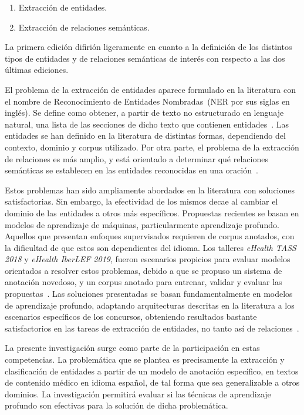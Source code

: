 \begin{enumerate}
	\item Extracción de entidades.
	\item Extracción de relaciones semánticas.
\end{enumerate}

La primera  edici\'on difiri\'on ligeramente en cuanto a la definición de los distintos tipos de entidades y de relaciones semánticas de interés con respecto a las dos \'ultimas ediciones.

El problema de la extracción de entidades aparece formulado en la literatura con el nombre de Reconocimiento de Entidades Nombradas~(NER por sus siglas en inglés).
Se define como obtener, a partir de texto no estructurado en lenguaje natural, una lista de las secciones de dicho texto que contienen entidades~\cite{ehealthkd19_overview, nadeau2007survey}.
Las entidades se han definido en la literatura de distintas formas, dependiendo del contexto, dominio y corpus utilizado.
Por otra parte, el problema de la extracción de relaciones es más amplio, y está orientado a determinar qué relaciones semánticas se establecen en las entidades reconocidas en una oración~\cite{ehealthkd19_overview, kumar2017survey}.

Estos problemas han sido ampliamente abordados en la literatura con soluciones satisfactorias.
Sin embargo, la efectividad de los mismos decae al cambiar el dominio de las entidades a otros más específicos.
Propuestas recientes se basan en modelos de aprendizaje de máquinas, particularmente aprendizaje profundo.
Aquellos que presentan enfoques supervisados requieren de corpus anotados, con la dificultad de que estos son dependientes del idioma.
Los talleres \textit{eHealth TASS 2018} y \textit{eHealth IberLEF 2019}, fueron escenarios propicios para evaluar modelos orientados a resolver estos problemas, debido a que se propuso un sistema de anotación novedoso, y un corpus anotado para entrenar, validar y evaluar las propuestas~\cite{piad2019corpus}.
Las soluciones presentadas se basan fundamentalmente en modelos de aprendizaje profundo, adaptando arquitecturas descritas en la literatura a los escenarios específicos de los concursos, obteniendo resultados bastante satisfactorios en las tareas de extracción de entidades, no tanto así de relaciones~\cite{zavala2018hybrid, medina2018joint, lopez2018sinai, catala2019coin_flipper, alvarado2019uh, colon2019hulat, medina2019talp, lara2019lsi2}.

La presente investigación surge como parte de la participación en estas competencias.
La problemática que se plantea es precisamente la extracción y clasificación de entidades a partir de un modelo de anotación específico, en textos de contenido médico en idioma español, de tal forma que sea generalizable a otros dominios.
La investigación permitirá evaluar si las técnicas de aprendizaje profundo son efectivas para la solución de dicha problemática.


